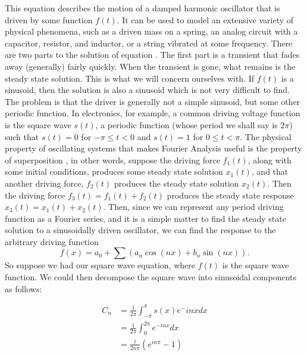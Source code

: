 \documentclass[a4paper,12pt]{article}
\begin{document}
        This equation describes the motion of a damped harmonic oscillator that is
        driven by some function $f(t)$. It can be used to model an extensive variety of
        physical phenomena, such as a driven mass on a spring, an analog circuit with a
        capacitor, resistor, and inductor, or a string vibrated at some frequency. There
        are two parts to the solution of equation . The first part is a transient that
        fades away (generally) fairly quickly. When the transient is gone, what remains
        is the steady state solution. This is what we will concern ourselves with.
        If $f(t)$ is a sinusoid, then the solution is also a sinusoid which is not very
        difficult to find. The problem is that the driver is generally not a simple sinusoid,
        but some other periodic function. In electronics, for example, a common driving
        voltage function is the square wave $s(t)$, a periodic function (whose period we
        shall say is $2\pi$) such that $s(t) = 0$ for $-\pi \leq t < 0$ and $s(t) = 1$ for $0 \leq t < \pi$.
        The physical property of oscillating systems that makes Fourier Analysis
        useful is the property of superposition , in other words, suppose the driving force 
        $f_{1}(t)$, along with some initial conditions, produces some steady state solution
        $x_{1}(t)$, and that another driving force, $f_{2}(t)$ produces the steady state solution
        $x_{2}(t)$. Then the driving force $f_{3}(t) = f_{1}(t) + f_{2}(t)$ produces the steady state
        response $x_{3}(t) = x_{1}(t) + x_{2}(t).$
        Then, since we can represent any period driving function as a Fourier series,
        and it is a simple matter to find the steady state solution to a sinusoidally driven oscillator, we can find the response to the arbitrary driving function
        $$ f(x) = a_0 + \sum(a_n \cos(nx) + b_n\sin(nx)).$$
        So suppose we had our square wave equation, where $f(t)$ is the square wave
        function. We could then decompose the square wave into sinusoidal components
        as follows:

        \begin{equation*}
            \begin{split}
                C_{n} & = \frac{1}{2\pi}\int_{-\pi}^{\pi}s(x)e^-{inx} dx\\[2.5mm]
                & = \frac{1}{2\pi}\int_{0}^{2\pi}e^{-inx} dx\\[2.5mm]
                & = \frac{i}{2n\pi}\left(e^{in\pi} - 1\right)
            \end{split}
        \end{equation*}
\end{document}
